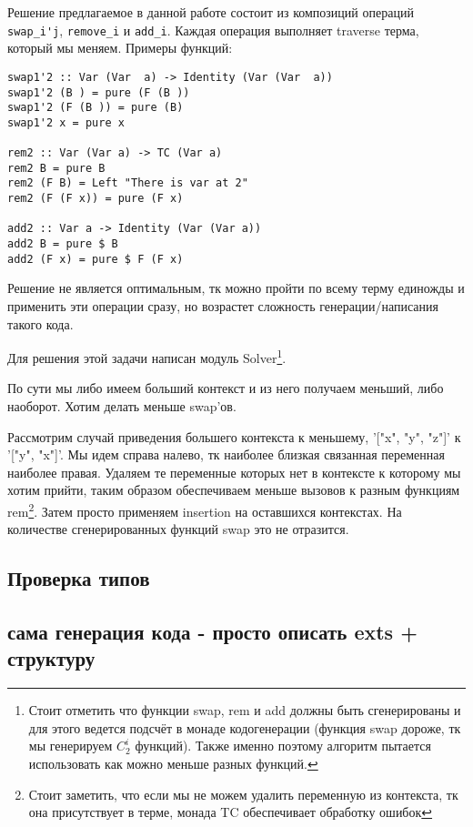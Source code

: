 Решение предлагаемое в данной работе состоит из композиций операций \lstinline{swap_i'j}, \lstinline{remove_i} и \lstinline{add_i}. Каждая операция выполняет traverse терма, который мы меняем. Примеры функций:
\begin{lstlisting}
swap1'2 :: Var (Var  a) -> Identity (Var (Var  a))
swap1'2 (B ) = pure (F (B ))
swap1'2 (F (B )) = pure (B)
swap1'2 x = pure x

rem2 :: Var (Var a) -> TC (Var a)
rem2 B = pure B
rem2 (F B) = Left "There is var at 2"
rem2 (F (F x)) = pure (F x)

add2 :: Var a -> Identity (Var (Var a))
add2 B = pure $ B
add2 (F x) = pure $ F (F x)
\end{lstlisting}

Решение не является оптимальным, тк можно пройти по всему терму единожды и применить эти операции сразу, но возрастет сложность генерации/написания такого кода.

Для решения этой задачи написан модуль Solver\footnote{Стоит отметить что функции swap, rem и add должны быть сгенерированы и для этого ведется подсчёт в монаде кодогенерации (функция swap дороже, тк мы генерируем $C_2^i$ функций). Также именно поэтому алгоритм пытается использовать как можно меньше разных функций.}.

По сути мы либо имеем больший контекст и из него получаем меньший, либо наоборот. Хотим делать меньше swap'ов.

Рассмотрим случай приведения большего контекста к меньшему, '["x", "y", "z"]' к '["y", "x"]'. Мы идем справа налево, тк наиболее близкая связанная переменная наиболее правая. Удаляем те переменные которых нет в контексте к которому мы хотим прийти, таким образом обеспечиваем меньше вызовов к разным функциям rem\footnote{Стоит заметить, что если мы не можем удалить переменную из контекста, тк она присутствует в терме, монада TC обеспечивает обработку ошибок}. Затем просто применяем insertion на оставшихся контекстах. На количестве сгенерированных функций swap это не отразится.

\subsection{Проверка типов}

\subsection{сама генерация кода - просто описать exts + структуру}






